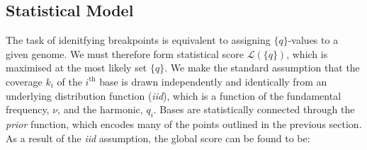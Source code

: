 \documentclass[fleqn,usenatbib]{acmart}
\begin{document}
{				\subsection{Statistical Model}\label{A:Model}

					The task of idenitfying breakpoints is equivalent to assigning $\{q\}$-values to a given genome. We must therefore form statistical score $\mathcal{L}(\{q\})$, which is maximised at the most likely set $\{q\}$. We make the standard assumption that the coverage $k_i$ of the $i^\text{th}$ base is drawn independently and identically from an underlying distribution function (\textit{iid}), which is a function of the fundamental frequency, $\nu$, and the harmonic, $q_i$. Bases are statistically connected through the \textit{prior} function, which encodes many of the points outlined in the previous section. As a result of the \textit{iid} assumption, the global score can be found to be:
			
}
\end{document}

